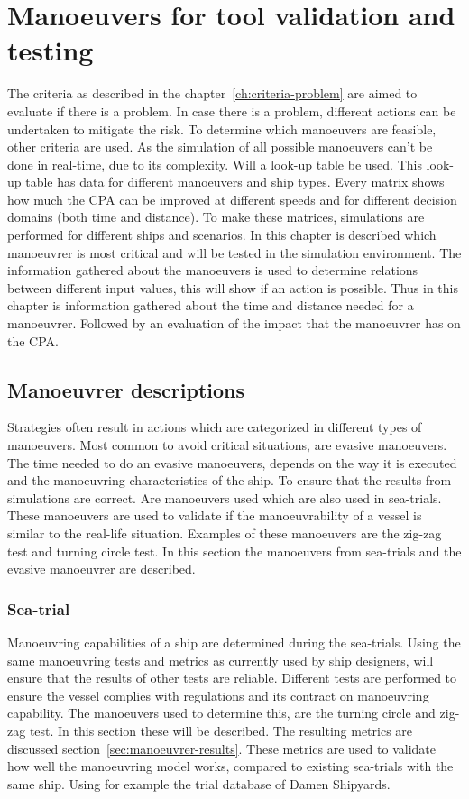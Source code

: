 \chapter{Manoeuvers for tool validation and testing}
\label{ch:criteria-manouvre}
The criteria as described in the chapter~\ref{ch:criteria-problem} are aimed to evaluate if there is a problem. In case there is a problem, different actions can be undertaken to mitigate the risk. To determine which manoeuvers are feasible, other criteria are used. As the simulation of all possible manoeuvers can't be done in real-time, due to its complexity. Will a look-up table be used. This look-up table has data for different manoeuvers and ship types. Every matrix shows how much the CPA can be improved at different speeds and for different decision domains (both time and distance).
To make these matrices, simulations are performed for different ships and scenarios. In this chapter is described which manoeuvrer is most critical and will be tested in the simulation environment. The information gathered about the manoeuvers is used to determine relations between different input values, this will show if an action is possible. Thus in this chapter is information gathered about the time and distance needed for a manoeuvrer. Followed by an evaluation of the impact that the manoeuvrer has on the CPA.

\section{Manoeuvrer descriptions}
\label{sec:manoeuvrer-description}
Strategies often result in actions which are categorized in different types of manoeuvers. Most common to avoid critical situations, are evasive manoeuvers. The time needed to do an evasive manoeuvers, depends on the way it is executed and the manoeuvring characteristics of the ship. To ensure that the results from simulations are correct. Are manoeuvers used which are also used in sea-trials. These manoeuvers are used to validate if the manoeuvrability of a vessel is similar to the real-life situation. Examples of these manoeuvers are the zig-zag test and turning circle test. In this section the manoeuvers from sea-trials and the evasive manoeuvrer are described.

\subsection{Sea-trial}
Manoeuvring capabilities of a ship are determined during the sea-trials. Using the same manoeuvring tests and metrics as currently used by ship designers, will ensure that the results of other tests are reliable. Different tests are performed to ensure the vessel complies with regulations and its contract on manoeuvring capability. The manoeuvers used to determine this, are the turning circle and zig-zag test. In this section these will be described. The resulting metrics are discussed section~\ref{sec:manoeuvrer-results}. These metrics are used to validate how well the manoeuvring model works, compared to existing sea-trials with the same ship. Using for example the trial database of Damen Shipyards.

